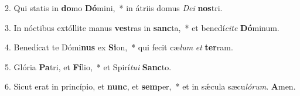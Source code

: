 2. Qui statis in \textbf{do}mo \textbf{Dó}mini,~*  in átriis domus \textit{De}\textit{i} \textbf{nos}tri.\

3. In nóctibus extóllite manus \textbf{ves}tras in \textbf{sanc}ta,~*  et benedí\textit{ci}\textit{te} \textbf{Dó}minum.\

4. Benedícat te Dómi\textbf{nus} ex \textbf{Si}on,~*  qui fecit cæ\textit{lum} \textit{et} \textbf{ter}ram.\

5. Glória \textbf{Pa}tri, et \textbf{Fí}lio,~*  et Spirí\textit{tu}\textit{i} \textbf{Sanc}to.\

6. Sicut erat in princípio, et \textbf{nunc}, et \textbf{sem}per,~*  et in sǽcula sæcu\textit{ló}\textit{rum}. \textbf{A}men.\

